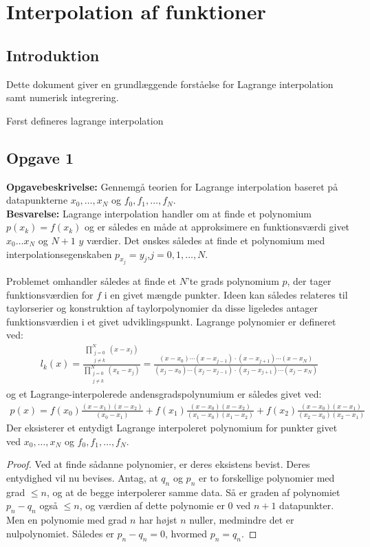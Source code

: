 \chapter{Interpolation af funktioner}
% 
\section*{Introduktion}
Dette dokument giver en grundlæggende forståelse for Lagrange interpolation samt numerisk integrering. 

Først defineres lagrange interpolation
\section*{Opgave 1}
\textbf{Opgavebeskrivelse:} Gennemgå teorien for Lagrange interpolation baseret på datapunkterne $x_0, \ldots, x_N$ og $f_0, f_1, \ldots , f_N$. \\
\textbf{Besvarelse:} 
Lagrange interpolation handler om at finde et polynomium $p(x_k)=f(x_k)$ og er således en måde at approksimere en funktionsværdi givet $x_0 \ldots x_N$ og $N+1 $  $y$ værdier.
Det ønskes således at finde et polynomium med interpolationsegenskaben $p_{x_j}=y_j$,$j=0,1,\ldots,N$.

Problemet omhandler således at finde et $N$'te grads polynomium $p$, der tager funktionsværdien for $f$ i en givet mængde punkter. Ideen kan således relateres til taylorserier og konstruktion af taylorpolynomier da disse ligeledes antager funktionsværdien i et givet udviklingspunkt.
Lagrange polynomier er defineret ved:
\begin{align*}
l_k(x)=\frac{\prod_{\substack{j=0 \\ {j \neq k}}}^{N}(x-x_j)}{\prod_{\substack{j=0 \\ {j \neq k}}}^{N}(x_k-x_j)}=\frac{(x-x_0) \cdots (x-x_{j-1}) \cdot (x-x_{j+1})\cdots(x-x_N)}{(x_j-x_0)\cdots (x_j-x_{j-1}) \cdot (x_j-x_{j+1})\cdots (x_j - x_N)}
\end{align*}
og et Lagrange-interpolerede andensgradspolynumium er således givet ved:
\begin{align*}
p(x)=f(x_0)\frac{(x-x_1)(x-x_2)}{(x_0-x_1)}+f(x_1)\frac{(x-x_0)(x-x_2)}{(x_1-x_0)(x_1-x_2)}+f(x_2)\frac{(x-x_0)(x-x_1)}{(x_2-x_0)(x_2-x_1)}
\end{align*}
Der eksisterer et entydigt Lagrange interpoleret polynomium for punkter givet ved $x_0, \ldots, x_N$ og $f_0, f_1, \ldots , f_N$.
\begin{proof}
Ved at finde sådanne polynomier, er deres eksistens bevist. Deres entydighed vil nu bevises. 
Antag, at $q_n$ og $p_n$ er to forskellige polynomier med grad $\leq n$, og at de begge interpolerer samme data. 
Så er graden af polynomiet $p_n - q_n$ også $\leq n$, og værdien af dette polynomie er $0$ ved $n+1$ datapunkter. 
Men en polynomie med grad $n$ har højst $n$ nuller, medmindre det er nulpolynomiet. 
Således er $p_n - q_n = 0$, hvormed $p_n = q_n$. 
\end{proof}
